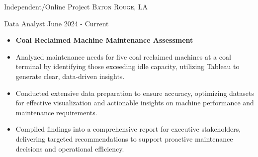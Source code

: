 \documentclass[10pt,a4paper]{article}
\begin{document}
\spacedhrule{0em}{-1em}


\headedsection
{Independent/Online Project}
{{\small \textsc{Baton Rouge, LA}}}
{
  \headedsubsection
  {Data Analyst}
  {June 2024 - Current}
  {
    \begin{itemize}
     \item[] \textbf{Coal Reclaimed Machine Maintenance Assessment}
      \item Analyzed maintenance needs for five coal reclaimed machines at a coal terminal by identifying those exceeding idle
capacity, utilizing Tableau to generate clear, data-driven insights.
      \item Conducted extensive data preparation to ensure accuracy, optimizing datasets for effective visualization and actionable
insights on machine performance and maintenance requirements.
       \item Compiled findings into a comprehensive report for executive stakeholders, delivering targeted recommendations to
support proactive maintenance decisions and operational efficiency.
    \end{itemize}
  }
 }
\end{document}
